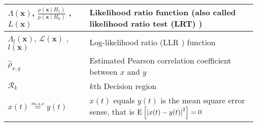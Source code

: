 \begin{xltabular}{\textwidth}{XX}
	\(\Lambda(\mathbf{x})\)\cite{leon-garciaProbabilityStatisticsRandom2007}, \(\frac{p(\mathbf{x} \mid H_1)}{p(\mathbf{x} \mid H_0)}\) \cite{leon-garciaProbabilityStatisticsRandom2007,kayFundamentalsStatisticalProcessing2009}, \(L(\mathbf{x})\) \cite{kayFundamentalsStatisticalProcessing2009,CharlesPES} & Likelihood ratio function (also called likelihood ratio test (LRT) \cite{kayFundamentalsStatisticalProcessing2009})                                                                                                                                                   \\ \hline
	\(\Lambda_l(\mathbf{x})\), \(\mathcal{L}(\mathbf{x})\) \cite{CharlesPES}, \(l(\mathbf{x})\) \cite{kayFundamentalsStatisticalProcessing2009}                                                                                                                                                                  & Log-likelihood ratio (LLR \cite{kayFundamentalsStatisticalProcessing2009}) function                                                                                                                                                                                   \\ \hline
	\(\hat{\rho}_{x,y}\)                                                                                                                                                                                                                                                                                         & Estimated Pearson correlation coefficient between \(x\) and \(y\)                                                                                                                                                                                                     \\ \hline
	\(\mathcal{R}_k\)                                                                                                                                                                                                                                                                                            & \(k\)th Decision region                                                                                                                                                                                                                                               \\ \hline
	\(x(t)\overset{m.s.e}{=}y(t)\)                                                                                                                                                                                                                                                                               & \(x(t)\) equals \(y(t)\) is the mean square error sense, that is \(\E{\abs{x(t) - y(t)}^2} = 0\)                                                                                                                                                                      \\ \hline

\end{xltabular}
